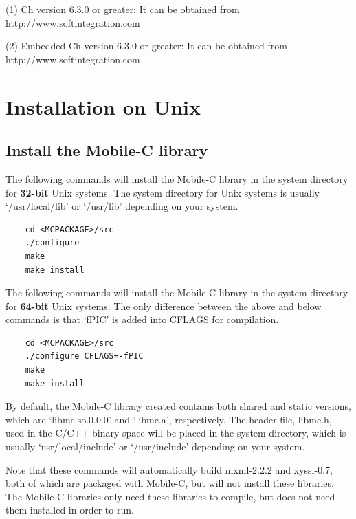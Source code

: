\documentclass[11pt]{report}
\begin{document}
\noindent
(1) Ch version 6.3.0 or greater: It can be obtained from http://www.softintegration.com

\noindent
(2) Embedded Ch version 6.3.0 or greater: It can be obtained from http://www.softintegration.com


\section{Installation on Unix}

\subsection{Install the Mobile-C library}
The following commands will install the Mobile-C library in the system 
directory for {\bf 32-bit} Unix systems. 
The system directory for Unix systems is usually `/usr/local/lib' or 
  `/usr/lib' depending on your system.

\begin{verbatim}
    cd <MCPACKAGE>/src
    ./configure
    make
    make install
\end{verbatim}

The following commands will install the Mobile-C library in the system 
  directory for {\bf 64-bit} Unix systems. 
The only difference between the above and below commands is that `fPIC' is 
  added into CFLAGS for compilation.

\begin{verbatim}
    cd <MCPACKAGE>/src
    ./configure CFLAGS=-fPIC
    make
    make install
\end{verbatim}

By default, the Mobile-C library created contains both shared and static 
versions, which are `libmc.so.0.0.0' and `libmc.a', respectively.
The header file, libmc.h, used in the C/C++ binary 
space will be placed in the system directory, which is usually 
`usr/local/include' or `/usr/include' depending on your system.
 
Note that these commands will automatically build mxml-2.2.2 and
xyssl-0.7, both of which are packaged with Mobile-C, but will
not install these libraries. The Mobile-C libraries only need
these libraries to compile, but does not need them installed in
order to run.
\end{document}
